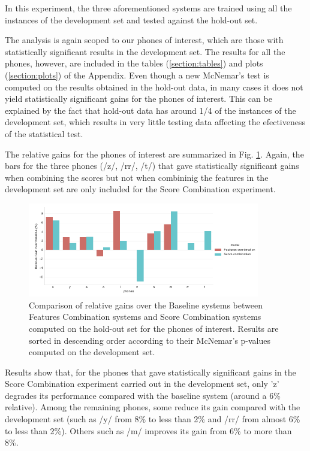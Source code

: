 In this experiment, the three aforementioned systems are trained using all the instances of the
development set and tested against the hold-out set.

The analysis is again scoped to our phones of interest, which are those with statistically
significant results in the development set.
The results for all the phones, however, are included in the tables
(\ref{section:tables}) and plots (\ref{section:plots})
of the Appendix.
Even though a new McNemar's test is computed on the
results obtained in the hold-out data, in many cases it does not yield statistically significant gains
for the phones of interest. This can be explained by the fact that hold-out data
has around 1/4 of the instances of the
development set, which results in very little testing data
affecting the efectiveness of the statistical test.

The relative gains for the phones of interest are summarized in Fig. \ref{fig:fusionMcnemarTest}.
Again, the bars for the three phones (/z/, /rr/, /t/) that gave statistically significant
gains when combining the scores but not when combininig the features in the development
set are only included for the Score Combination experiment.

\begin{figure}[H]
	\centering
	\includegraphics[width=0.9\textwidth]{files/figures/results/relatives/relative-fusion-systems-heldout-mcnemar.png}
	\caption{Comparison of relative gains over the Baseline systems
	between Features Combination systems and Score Combination
	systems computed on the hold-out set for the phones of interest.
	Results are sorted
	in descending order according to their McNemar's p-values computed on the development set.}
	\label{fig:fusionMcnemarTest}
\end{figure}

Results show that, for the phones that gave statistically significant gains
in the Score Combination
experiment carried out in the development set, only 'z' degrades its performance compared
with the baseline system (around a 6\% relative). Among the
remaining phones, some reduce its gain compared with the development set (such as
/y/ from 8\% to less than 2\% and /rr/ from almost 6\% to less than 2\%). Others such
as /m/ improves its gain from 6\% to more than 8\%.

